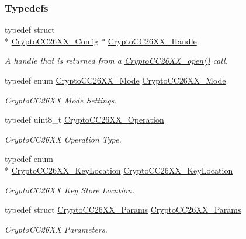 \subsubsection*{Typedefs}
\begin{DoxyCompactItemize}
\item 
typedef struct \\*
\hyperlink{struct_crypto_c_c26_x_x___config}{Crypto\-C\-C26\-X\-X\-\_\-\-Config} $\ast$ \hyperlink{_crypto_c_c26_x_x_8h_a8737c63107a1cb5548ba06f7a48259b5}{Crypto\-C\-C26\-X\-X\-\_\-\-Handle}
\begin{DoxyCompactList}\small\item\em A handle that is returned from a \hyperlink{_crypto_c_c26_x_x_8h_a21aa1458d0b063ee3637a40487e8ee12}{Crypto\-C\-C26\-X\-X\-\_\-open()} call. \end{DoxyCompactList}\item 
typedef enum \hyperlink{_crypto_c_c26_x_x_8h_abf86c8ac428559f00fed3299d439e2cd}{Crypto\-C\-C26\-X\-X\-\_\-\-Mode} \hyperlink{_crypto_c_c26_x_x_8h_a2a7a223869fb2c7f4b577f3552563d16}{Crypto\-C\-C26\-X\-X\-\_\-\-Mode}
\begin{DoxyCompactList}\small\item\em Crypto\-C\-C26\-X\-X Mode Settings. \end{DoxyCompactList}\item 
typedef uint8\-\_\-t \hyperlink{_crypto_c_c26_x_x_8h_a28465385e5b45efecc00f2015605f970}{Crypto\-C\-C26\-X\-X\-\_\-\-Operation}
\begin{DoxyCompactList}\small\item\em Crypto\-C\-C26\-X\-X Operation Type. \end{DoxyCompactList}\item 
typedef enum \\*
\hyperlink{_crypto_c_c26_x_x_8h_a5266637af2c4ac36ed58d4e0f158b706}{Crypto\-C\-C26\-X\-X\-\_\-\-Key\-Location} \hyperlink{_crypto_c_c26_x_x_8h_a4e214e5283d16ac67e593c7c8a5bc058}{Crypto\-C\-C26\-X\-X\-\_\-\-Key\-Location}
\begin{DoxyCompactList}\small\item\em Crypto\-C\-C26\-X\-X Key Store Location. \end{DoxyCompactList}\item 
typedef struct \hyperlink{struct_crypto_c_c26_x_x___params}{Crypto\-C\-C26\-X\-X\-\_\-\-Params} \hyperlink{_crypto_c_c26_x_x_8h_afd8b8a794d92fe38d4806238c3b6fef7}{Crypto\-C\-C26\-X\-X\-\_\-\-Params}
\begin{DoxyCompactList}\small\item\em Crypto\-C\-C26\-X\-X Parameters. \end{DoxyCompactList}\item 

\end{DoxyCompactItemize}
